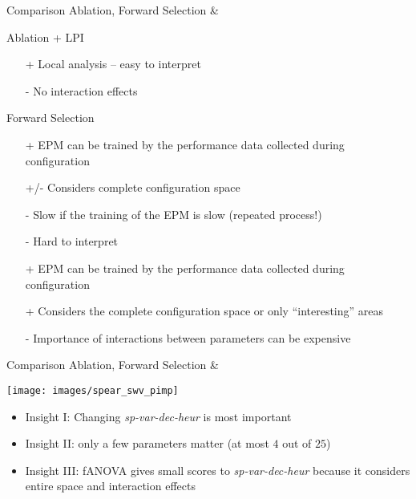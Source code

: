 \begin{frame}[c]{Comparison Ablation, Forward Selection \& \fanova{}}

\small
\begin{block}{Ablation + LPI}
\begin{itemize}
  \item[+] Local analysis -- easy to interpret
  \item[-] No interaction effects  
\end{itemize}
\end{block}

\vspace{-0.5em}
\begin{block}{Forward Selection}
\begin{itemize}
  \item[+] EPM can be trained by the performance data collected during configuration
  \item[+/-] Considers complete configuration space
  \item[-] Slow if the training of the EPM is slow (repeated process!)
  \item[-] Hard to interpret
\end{itemize}
\end{block}

\vspace{-0.5em}
\begin{block}{\fanova}
\begin{itemize}
  \item[+] EPM can be trained by the performance data collected during configuration
  \item[+] Considers the complete configuration space or only ``interesting'' areas
  \item[-] Importance of interactions between parameters can be expensive 
\end{itemize}
\end{block}

\end{frame}
\begin{frame}[c]{Comparison Ablation, Forward Selection \& \fanova{}}

\centering
\texttt{[image: images/spear\_swv\_pimp]}

\pause
\bigskip

\begin{itemize}
  \item \alert{Insight I:} Changing \textit{sp-var-dec-heur} is most important
  \item \alert{Insight II:} only a few parameters matter (at most $4$ out of $25$)
  \item \alert{Insight III:} fANOVA gives small scores to \textit{sp-var-dec-heur} because it considers entire space and interaction effects
\end{itemize}

\end{frame}
